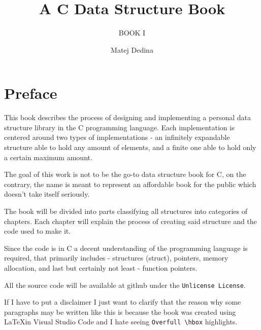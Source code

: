 \documentclass[graybox,envcountchap,sectrefs]{SNmono}
\begin{document}
\author{Matej Dedina}
\title{A C Data Structure Book}
\subtitle{BOOK I}
\maketitle

\frontmatter%

% 
% 

\chapter*{Preface}

This book describes the process of designing and implementing a personal data structure library in the C programming language. Each implementation is centered around two types of implementations - an infinitely expandable structure able to hold any amount of elements, and a finite one able to hold only a certain maximum amount.

The goal of this work is not to be the go-to data structure book for C, on the contrary, the name is meant to represent an affordable book for the public which doesn't take itself seriously.

The book will be divided into parts classifying all structures into categories of chapters. Each chapter will explain the process of creating said structure and the code used to make it. 

Since the code is in C a decent understanding of the programming language is required, that primarily includes - structures (struct), pointers, memory allocation, and last but certainly not least - function pointers.

All the source code will be available at github under the {\texttt{Unlicense License}}.

If I have to put a disclaimer I just want to clarify that the reason why some paragraphs may be written like this is because the book was created using \LaTeX in Visual Studio Code and I hate seeing {\texttt{Overfull \textbackslash hbox}} highlights.

% 
% 

\tableofcontents

% 

\mainmatter%









%

%
%
\printindex

\end{document}
